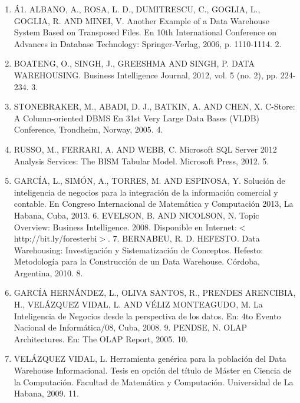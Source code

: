 \documentclass{article} %
\begin{document}
\begin{enumerate}
\item  \'{A}1.  ALBANO, A., ROSA, L. D., DUMITRESCU, C., GOGLIA, L., GOGLIA, R.  AND MINEI, V. Another Example of a Data Warehouse System Based on Transposed Files. En 10th International Conference on Advances in Database Technology: Springer-Verlag, 2006, p. 1110-1114. 2.  

\item  BOATENG, O., SINGH, J., GREESHMA AND SINGH, P. DATA WAREHOUSING. Business Intelligence Journal, 2012, vol. 5 (no. 2), pp. 224-234. 3.  

\item  STONEBRAKER, M., ABADI, D. J., BATKIN, A. AND CHEN, X.  C-Store: A Column-oriented DBMS En 31st Very Large Data Bases (VLDB) Conference, Trondheim, Norway, 2005. 4.

\item  RUSSO, M., FERRARI, A.  AND WEBB, C. Microsoft SQL Server 2012 Analysis Services: The BISM Tabular Model. Microsoft Press, 2012. 5.  

\item  GARC\'{I}A, L., SIM\'{O}N, A., TORRES, M. AND ESPINOSA, Y. Soluci\'{o}n de inteligencia de negocios para la integraci\'{o}n de la informaci\'{o}n comercial y contable.  En Congreso Internacional de Matem\'{a}tica y Computaci\'{o}n 2013, La Habana, Cuba, 2013. 6.  EVELSON, B. AND NICOLSON, N. Topic Overview: Business Intelligence.  2008. Disponible en Internet:$\mathrm{<}$http://bit.ly/foresterbi$\mathrm{>}$.  7.  BERNABEU, R. D. HEFESTO. Data Warehousing: Investigaci\'{o}n y Sistematizaci\'{o}n de Conceptos. Hefesto: Metodolog\'{i}a para la Construcci\'{o}n de un Data Warehouse. C\'{o}rdoba, Argentina, 2010. 8.  

\item  GARC\'{I}A HERN\'{A}NDEZ, L., OLIVA SANTOS, R., PRENDES ARENCIBIA, H., VEL\'{A}ZQUEZ VIDAL, L. AND V\'{E}LIZ MONTEAGUDO, M. La Inteligencia de Negocios desde la perspectiva de los datos. En: 4to Evento Nacional de Inform\'{a}tica/08, Cuba, 2008. 9.  PENDSE, N. OLAP Architectures. En: The OLAP Report, 2005. 10.  

\item  VEL\'{A}ZQUEZ VIDAL, L.  Herramienta    gen\'{e}rica para la poblaci\'{o}n del Data Warehouse Informacional. Tesis en opci\'{o}n del t\'{i}tulo de M\'{a}ster en Ciencia de la Computaci\'{o}n. Facultad de Matem\'{a}tica y Computaci\'{o}n. Universidad de La Habana, 2009. 11.  
\end{enumerate}

\noindent \textbf{}
\end{document}
